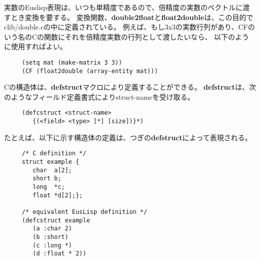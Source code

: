 実数のEuslisp表現は、いつも単精度であるので、倍精度の実数のベクトルに渡すとき変換を要する。
変換関数、{\bf double2float}と{\bf float2double}は、この目的でclib/double.cの中に定義されている。
例えば、もし3x3の実数行列があり、CFのいう名のCの関数にそれを倍精度実数の行列として渡したいなら、
以下のように使用すればよい。
\begin{verbatim}
     (setq mat (make-matrix 3 3))
     (CF (float2double (array-entity mat)))
\end{verbatim}

Cの構造体は、{\bf defstruct}マクロにより定義することができる。
{\bf defstruct}は、次のようなフィールド定義書式によりstruct-nameを受け取る。

\begin{verbatim}
     (defcstruct <struct-name>
        {(<field> <type> [*] [size])}*)
\end{verbatim}
たとえば、以下に示す構造体の定義は、つぎの{\bf defstruct}によって表現される。
\begin{verbatim}
     /* C definition */
     struct example {
        char  a[2];
        short b;
        long  *c;
        float *d[2];};

     /* equivalent EusLisp definition */
     (defcstruct example
        (a :char 2)
        (b :short)
        (c :long *)
        (d :float * 2))
\end{verbatim}

